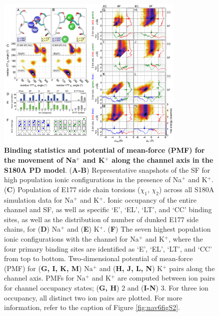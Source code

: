 \begin{refsection}
\begin{figure}[!ptb]
\centering
\includegraphics[width=0.8\textwidth]{nav6/Nav6FigS3}
\caption[Binding statistics and potential of mean-force (PMF) for the movement of Na$^+$ and K$^+$ along the channel axis in the S180A PD model]{ \textbf{Binding statistics and potential of mean-force (PMF) for the movement of Na$^+$ and K$^+$ along the channel axis in the S180A PD model}. (\textbf{A-B}) Representative snapshots of the SF for high population ionic configurations in the presence of Na$^+$ and K$^+$. (\textbf{C}) Population of E177 side chain torsions ($\chi_1$, $\chi_2$) across all S180A simulation data for Na$^+$ and K$^+$. Ionic occupancy of the entire channel and SF, as well as specific `E', `EL', `LT', and `CC' binding sites, as well as the distribution of number of dunked E177 side chains, for (\textbf{D}) Na$^+$ and (\textbf{E}) K$^+$. (\textbf{F}) The seven highest population ionic configurations with the channel for Na$^+$ and K$^+$, where the four primary binding sites are identified as `E', `EL', `LT', and `CC' from top to bottom. Two-dimensional potential of mean-force (PMF) for (\textbf{G, I, K, M}) Na$^+$ and (\textbf{H, J, L, N}) K$^+$ pairs along the channel axis. PMFs for Na$^+$ and K$^+$ are computed between ion pairs for channel occupancy states; (\textbf{G, H}) 2 and (\textbf{I-N}) 3. For three ion occupancy, all distinct two ion pairs are plotted. For more information, refer to the caption of Figure \ref{fig:nav6figS2}.}
\label{fig:nav6figS3}
\end{figure}


\end{refsection}
